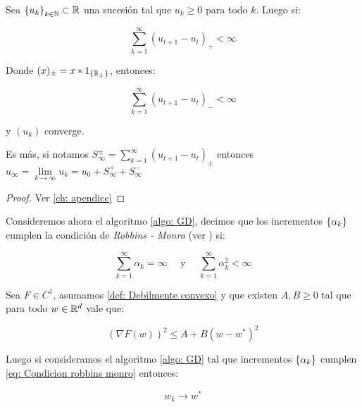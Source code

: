 \begin{lemma}
	\label{lemma: Convergencia de sucesiones positivas acotadas sumables}
	Sea $\left\lbrace u_k\right\rbrace_{k \in {\mathbb{N}}} \subset {\mathbb{R}}$ una sucesi\'on tal que $u_k \geq 0$ para todo $k$. Luego si:
	
	\begin{equation*}
		\sum\limits_{k=1}^{\infty} {\left(u_{t+1} - u_t\right)_{+}} < \infty
	\end{equation*}
	
	Donde $(x)_{\pm} = x * 1_{\left\lbrace{\mathbb{R}}_{\pm}\right\rbrace}$, entonces:
	
	\begin{equation*}
		\sum\limits_{k=1}^{\infty} {\left(u_{t+1} - u_t\right)_{-}} < \infty
	\end{equation*}
	
	 y $\left(u_k\right)$ converge. 
	 
	 Es m\'as, si notamos $S^{\pm}_{\infty} = \sum\limits_{k=1}^{\infty}  {\left(u_{t+1} - u_t\right)_{\pm}} $ entonces $u_{\infty} = \lim\limits_{k \rightarrow \infty} {u_k} = u_0 + S_{\infty}^+ + S_{\infty}^-$
\end{lemma}

\begin{proof}
	Ver \ref{ch: apendice}
\end{proof}

Consideremos ahora el algoritmo \ref{algo: GD}, decimos que los incrementos $\left\lbrace\alpha_k\right\rbrace$  cumplen la condici\'on de \textit{Robbins - Monro} (ver \cite{robbins:1951}) si:

\begin{equation}
\label{eq: Condicion robbins monro}
\sum\limits_{k=1}^{\infty} {\alpha_k} = \infty \quad \text{ y } \quad \sum\limits_{k=1}^{\infty} {\alpha_k^2} < \infty
\end{equation}

\begin{theorem}
	\label{theorem: convergencia puntual batch, objetivo debilmente convexo, incrementos decrecientes}
	Sea $F \in C^1$, asumamos \ref{def: Debilmente convexo} y que existen $A,B \geq 0$ tal que para todo $w \in {\mathbb{R}}^d$ vale que:
	
	\begin{equation}
	\label{eq: Condicion gradiente acotado, ctp, batch}
		\left(\nabla F(w)\right)^2 \leq A + B \left(w - w^*\right)^2
	\end{equation}
	
	Luego si consideramos el algoritmo \ref{algo: GD} tal que incrementos $\left\lbrace\alpha_k\right\rbrace$  cumplen \ref{eq: Condicion robbins monro} entonces:
	
	\begin{equation}
		w_k \rightarrow w^*
	\end{equation}
	
\end{theorem}

